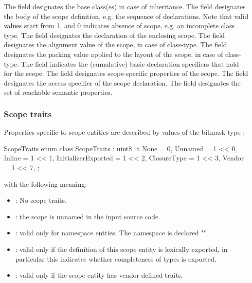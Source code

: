 \noindent
The  field designates the base class(es) in case of inheritance.
The  field designates the body of the scope definition, e.g. the sequence of declarations.  
Note that valid  values start from 1, and 0 indicates absence of scope, e.g. an incomplete class type.
The  field designates the declaration of the enclosing scope.
The  field designates the alignment value of the scope, in case of class-type.
The  field designates the packing value applied to the layout of the scope, in case of class-type.
The  field indicates the (cumulative) basic declaration specifiers that hold for the scope.
The  field designates scope-specific properties of the scope.
The  field designates the access specifier of the scope declaration.
The  field designates the set of reachable semantic properties.


\subsubsection{Scope traits}
\label{sec:ifc-scope-traits}

Properties specific to scope entities are described by values of the bitmask type :
%
\begin{typedef}{ScopeTraits}{}
	enum class ScopeTraits : uint8_t {
		None			= 0,
		Unnamed		= 1 << 0,
		Inline			= 1 << 1,
		InitializerExported	= 1 << 2,
		ClosureType	= 1 << 3,
		Vendor			= 1 << 7,
	};
\end{typedef}
%
with the following meaning:
\begin{itemize}
  \item {}: No scope traits.
  \item {}: the scope is unnamed in the input source code.
  \item {}: valid only for namespace entties.  The namespace is declared "".
   \item {}: valid only if the definition of this scope entity is lexically exported, in particular this indicates whether completeness of types is exported.
	\item {}: valid only if the scope entity has vendor-defined traits.

\end{itemize}

